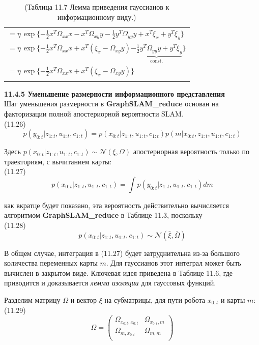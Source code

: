 \documentclass[10pt,a4paper]{article}
\begin{document}
\begin{table}[H]
\begin{center}
\begin{tabular}{|l|}
$=\eta\,\exp\{-\frac{1}{2}x^T\varOmega_{xx}x-x^T\varOmega_{xy}y-\frac{1}{2}y^T\varOmega_{yy}y+x^T\xi_x+y^T\xi_y\}$\\
$=\eta\,\exp\{ -\frac{1}{2}x^T\varOmega_{xx}x+x^T(\xi_x-\varOmega_{xy}y)\underbrace{-\frac{1}{2}y^T\varOmega_{yy}y+y^T\xi_y}_{\text{const.}}\}$\\
$=\eta\,\exp\{-\frac{1}{2}x^T\varOmega_{xx}x+x^T(\xi_x-\varOmega_{xy}y)\}$\\
{}\\
\hline
\end{tabular}
\caption{(Таблица 11.7    Лемма приведения гауссианов к информационному виду.)}
\end{center}
\end{table}

\textbf{11.4.5 Уменьшение размерности информационного представления}\\

Шаг уменьшения размерности в \textbf{GraphSLAM\_reduce} основан на факторизации полной апостериорной вероятности SLAM.\\

(11.26)
$$p(y_{0:t}|z_{1:t},u_{1:t},c_{1:t})=p(x_{0:t}|z_{1:t},u_{1:t},c_{1:t})p(m|x_{0:t},z_{1:t},u_{1:t},c_{1:t})$$

Здесь $p(x_{0:t}|z_{1:t},u_{1:t},c_{1:t})\sim\mathcal{N}(\xi,\varOmega)$ апостериорная вероятность только по траекториям, с вычитанием карты:\\

(11.27)
$$p(x_{0:t}|z_{1:t},u_{1:t},c_{1:t})=\int p(y_{0:t}|z_{1:t},u_{1:t},c_{1:t})dm$$

как вкратце будет показано, эта вероятность действительно вычисляется алгоритмом \textbf{GraphSLAM\_reduce} в Таблице 11.3, поскольку\\

(11.28)
$$p(x_{0:t}|z_{1:t},u_{1:t},c_{1:t})\sim\mathcal{N}(\bar{\xi},\bar{\varOmega})$$

В общем случае, интеграция в (11.27) будет затруднительна из-за большого количества переменных карты $m$. Для гауссианов этот интеграл может быть вычислен в закрытом виде. Ключевая идея приведена в Таблице 11.6, где приводится и доказывается \textit{лемма изоляции} для гауссовых функций.

Разделим матрицу $\varOmega$ и вектор $\xi$ на субматрицы, для пути робота $x_{0:t}$ и карты $m$:\\

(11.29)
$$\varOmega=\left(\begin{array}{cc}\varOmega_{x_{0:t},x_{0:t}}&\varOmega_{x_{0:t},m}\\\varOmega_{m,x_{0:t}}&\varOmega_{m,m}\\
\end{array} \right)$$
\end{document}
